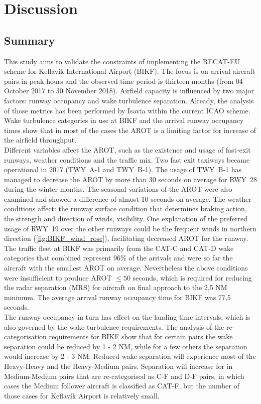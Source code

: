 


\chapter{Discussion}\label{cha:discussion}

\section{Summary}\label{sec:summary}
This study aims to validate the constraints of implementing the RECAT-EU scheme for Keflavík International Airport (BIKF). The focus is on arrival aircraft pairs in peak hours and the observed time period is thirteen months (from 04 October 2017 to 30 November 2018). 
Airfield capacity is influenced by two major factors: runway occupancy and wake turbulence separation. Already, the analysis of those metrics has been performed by Isavia within the current ICAO scheme. Wake turbulence categories in use at BIKF and the arrival runway occupancy times show that in most of the cases the AROT is a limiting factor for increase of the airfield throughput.  \\
Different variables affect the AROT, such as the existence and usage of fast-exit runways, weather conditions and the traffic mix. Two fast exit taxiways became operational in 2017 (TWY~A-1 and TWY~B-1). The usage of TWY~B-1 has managed to decrease the AROT by more than 30 seconds on average for RWY~28 during the winter months. The seasonal variations of the AROT were also examined and showed a difference of almost 10 seconds on average. The weather conditions affect: the runway surface condition that determines braking action, the strength and direction of winds, visibility. One explanation of the preferred usage of RWY~19 over the other runways could be the frequent winds in northern direction (\ref{fig:BIKF_wind_rose}), facilitating decreased AROT for the runway. The traffic fleet at BIKF was primarily from the CAT-C and CAT-D wake categories that combined represent 96\% of the arrivals and were so far the aircraft with the smallest AROT on average. Nevertheless the above conditions were insufficient to produce AROT $\leq 50$ seconds, which is required for reducing the radar separation (MRS) for aircraft on final approach to the 2,5 NM minimum. The average arrival runway occupancy time for BIKF was 77,5 seconds. \\
The runway occupancy in turn has effect on the landing time intervals, which is also governed by the wake turbulence requirements.
The analysis of the re-categorisation requirements for BIKF show that for certain pairs the wake separation could be reduced by 1 - 2 NM, while for a few others the separation would increase by 2 - 3 NM. Reduced wake separation will experience most of the Heavy-Heavy and the Heavy-Medium pairs. Separation will increase for in Medium-Medium pairs that are re-categorised as C-F and D-F pairs, in which cases the Medium follower aircraft is classified as CAT-F, but the number of those cases for Keflavík Airport is relatively small.\\
